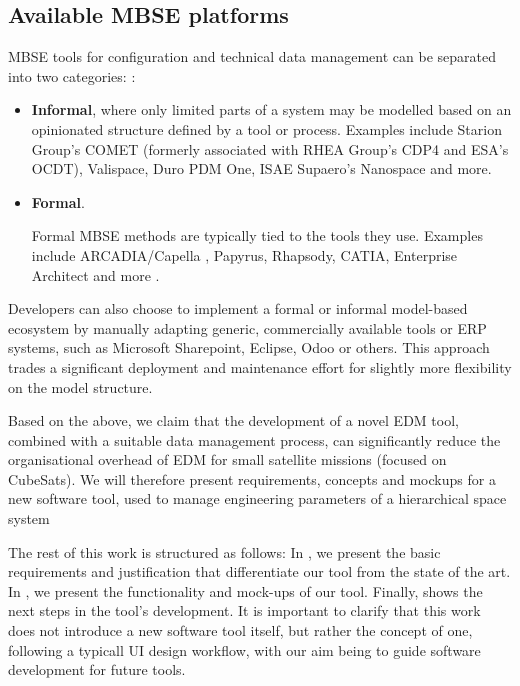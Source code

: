 \documentclass[]{iac}
\def\todo#1{}
\begin{document}
\subsection{Available MBSE platforms}
\acs{MBSE} tools for configuration and technical data management can be separated into two categories: \autocite{kanavouras_agile_2024}:
\begin{itemize}
\item \textbf{Informal}, where only limited parts of a system may be modelled based on an opinionated structure defined by a tool or process. Examples include Starion Group's COMET (formerly associated with RHEA Group's CDP4 and ESA's OCDT), Valispace, Duro PDM One, ISAE Supaero's Nanospace \autocite{gateau_open-source_2021} and more.

\item \textbf{Formal}.

Formal \acs{MBSE} methods are typically tied to the tools they use. Examples include ARCADIA/Capella \autocite{roques_mbse_2016}, Papyrus, Rhapsody, CATIA, Enterprise Architect and more \autocite{campo_model-based_2023}.

\end{itemize}

Developers can also choose to implement a formal or informal model-based ecosystem by manually adapting generic, commercially available tools or \acf{ERP} systems, such as Microsoft Sharepoint, Eclipse, Odoo or others. This approach trades a significant deployment and maintenance effort for slightly more flexibility on the model structure.

\par{}

Based on the above, we claim that the development of a novel \acf{EDM} tool, combined with a suitable data management process, can significantly reduce the organisational overhead of \acs{EDM} for small satellite missions (focused on CubeSats). We will therefore present requirements, concepts and mockups for a new software tool, used to manage engineering parameters of a hierarchical space system

The rest of this work is structured as follows: In , we present the basic requirements and justification that differentiate our tool from the state of the art. In , we present the functionality and mock-ups of our tool. Finally,  shows the next steps in the tool's development.
It is important to clarify that this work does not introduce a new software tool itself, but rather the concept of one, following a typicall \ac{UI} design workflow, with our aim being to guide software development for future tools. %
\end{document}
